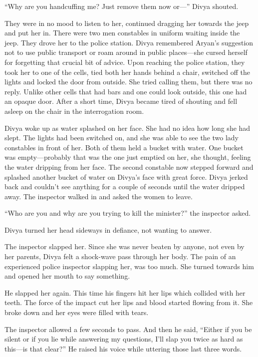 “Why are you handcuffing me? Just remove them now or—” Divya shouted.

They were in no mood to listen to her, continued dragging her towards the jeep
and put her in. There were two men constables in uniform waiting inside the
jeep. They drove her to the police station. Divya remembered Aryan's suggestion
not to use public transport or roam around in public places—she cursed herself
for forgetting that crucial bit of advice. Upon reaching the police station,
they took her to one of the cells, tied both her hands behind a chair, switched
off the lights and locked the door from outside. She tried calling them, but
there was no reply. Unlike other cells that had bars and one could look outside,
this one had an opaque door. After a short time, Divya became tired of shouting
and fell asleep on the chair in the interrogation room.

Divya woke up as water splashed on her face. She had no idea how long she had
slept. The lights had been switched on, and she was able to see the two lady
constables in front of her. Both of them held a bucket with water. One bucket
was empty—probably that was the one just emptied on her, she thought, feeling
the water dripping from her face. The second constable now stepped forward and
splashed another bucket of water on Divya's face with great force. Divya jerked
back and couldn't see anything for a couple of seconds until the water dripped
away. The inspector walked in and asked the women to leave.

“Who are you and why are you trying to kill the minister?” the inspector asked.

Divya turned her head sideways in defiance, not wanting to answer.

The inspector slapped her. Since she was never beaten by anyone, not even by her
parents, Divya felt a shock-wave pass through her body. The pain of an
experienced police inspector slapping her, was too much. She turned towards him
and opened her mouth to say something.

He slapped her again. This time his fingers hit her lips which collided with her
teeth. The force of the impact cut her lips and blood started flowing from it.
She broke down and her eyes were filled with tears.

The inspector allowed a few seconds to pass. And then he said, “Either if you be
silent or if you lie while answering my questions, I'll slap you twice as hard
as this—is that clear?” He raised his voice while uttering those last three
words.

